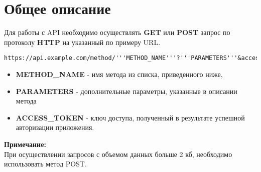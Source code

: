 \section{Общее описание}
\par
Для работы с API необходимо осуществлять \textbf{GET} или \textbf{POST} запрос
по протоколу \textbf{HTTP} на указанный по примеру URL.

\begin{Verbatim}[frame=single]
https://api.example.com/method/'''METHOD_NAME'''?'''PARAMETERS'''&access_token='''ACCESS_TOKEN'''
\end{Verbatim}

\begin{itemize}

  \item \textbf{METHOD\_NAME} - имя метода из списка, приведенного ниже,
  \item \textbf{PARAMETERS} - дополнительные параметры, указанные в описании метода
  \item \textbf{ACCESS\_TOKEN} - ключ доступа, полученный в результате успешной авторизации приложения.
\end{itemize}

\textbf{Примечание:} \\
При осуществлении запросов с объемом данных больше 2 кб, необходимо использовать метод POST.
